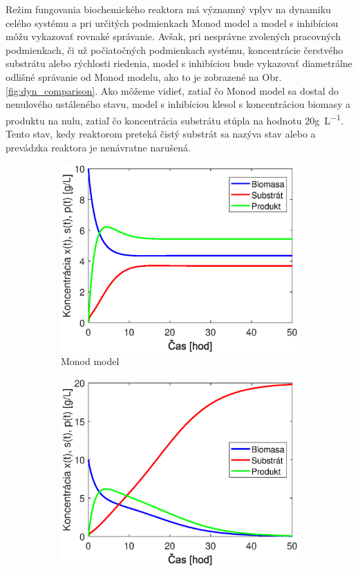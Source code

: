 Režim fungovania biochemického reaktora má významný vplyv na dynamiku celého systému a pri určitých podmienkach Monod model a model s inhibíciou môžu vykazovať rovnaké správanie. Avšak, pri nesprávne zvolených pracovných podmienkach, či už počiatočných podmienkach systému, koncentrácie čerstvého substrátu alebo rýchlosti riedenia, model s inhibíciou bude vykazovať diametrálne odlišné správanie od Monod modelu, ako to je zobrazené na Obr. \ref{fig:dyn_comparison}. Ako môžeme vidieť, zatiaľ čo Monod model sa dostal do nenulového ustáleného stavu, model s inhibíciou klesol s koncentráciou biomasy a produktu na nulu, zatiaľ čo koncentrácia substrátu stúpla na hodnotu 20\si{\gram\per\liter}. Tento stav, kedy reaktorom preteká čistý substrát sa nazýva stav  alebo  a prevádzka reaktora je nenávratne narušená.
\begin{figure}
	\centering
	\begin{subfigure}[b]{0.49\textwidth}
		\centering
		\includegraphics[width=\linewidth]{images/comparison_monod}
		\caption{Monod model}
		\label{fig:dyn_comparison_monod}
	\end{subfigure}
		\begin{subfigure}[b]{0.49\textwidth}
		\centering
		\includegraphics[width=\linewidth]{images/comparison_haldane}

\end{subfigure}
\end{figure}
